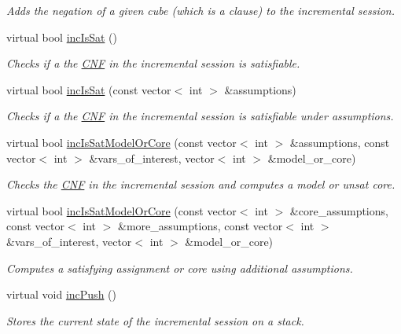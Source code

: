\begin{DoxyCompactItemize}
\begin{DoxyCompactList}\small\item\em Adds the negation of a given cube (which is a clause) to the incremental session. \end{DoxyCompactList}\item 
virtual bool \hyperlink{classMiniSatApi_a4c6ba65381002eb3f90e8e0df1606759}{inc\-Is\-Sat} ()
\begin{DoxyCompactList}\small\item\em Checks if a the \hyperlink{classCNF}{C\-N\-F} in the incremental session is satisfiable. \end{DoxyCompactList}\item 
virtual bool \hyperlink{classMiniSatApi_a40421bac2739bacb68f3c7083810694b}{inc\-Is\-Sat} (const vector$<$ int $>$ \&assumptions)
\begin{DoxyCompactList}\small\item\em Checks if a the \hyperlink{classCNF}{C\-N\-F} in the incremental session is satisfiable under assumptions. \end{DoxyCompactList}\item 
virtual bool \hyperlink{classMiniSatApi_afb886d40bb45b5cf2fadb7aee1a06b3e}{inc\-Is\-Sat\-Model\-Or\-Core} (const vector$<$ int $>$ \&assumptions, const vector$<$ int $>$ \&vars\-\_\-of\-\_\-interest, vector$<$ int $>$ \&model\-\_\-or\-\_\-core)
\begin{DoxyCompactList}\small\item\em Checks the \hyperlink{classCNF}{C\-N\-F} in the incremental session and computes a model or unsat core. \end{DoxyCompactList}\item 
virtual bool \hyperlink{classMiniSatApi_a776b2b0563b52f52152dcec931b7f557}{inc\-Is\-Sat\-Model\-Or\-Core} (const vector$<$ int $>$ \&core\-\_\-assumptions, const vector$<$ int $>$ \&more\-\_\-assumptions, const vector$<$ int $>$ \&vars\-\_\-of\-\_\-interest, vector$<$ int $>$ \&model\-\_\-or\-\_\-core)
\begin{DoxyCompactList}\small\item\em Computes a satisfying assignment or core using additional assumptions. \end{DoxyCompactList}\item 
virtual void \hyperlink{classMiniSatApi_a27013ace25320f68252bef5ba9f2e9ad}{inc\-Push} ()
\begin{DoxyCompactList}\small\item\em Stores the current state of the incremental session on a stack. \end{DoxyCompactList}\item 

\end{DoxyCompactItemize}
